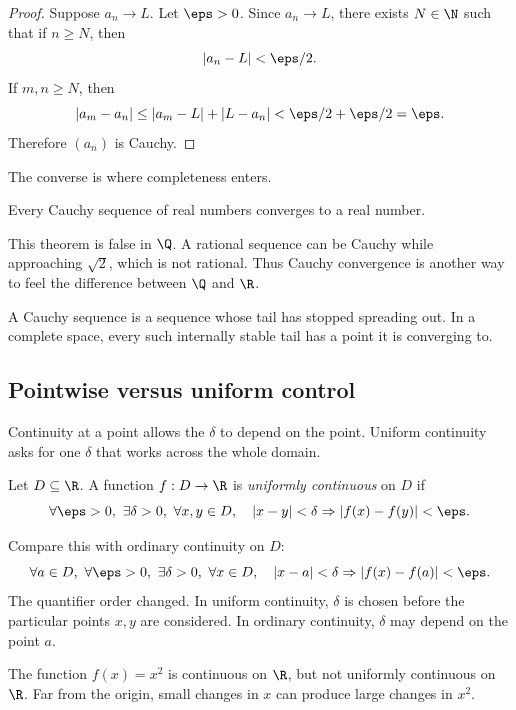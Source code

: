 \begin{proof}
Suppose $a_n\to L$. Let $\eps>0$. Since $a_n\to L$, there exists
$N\in\N$ such that if $n\geq N$, then
\[
|a_n-L|<\eps/2.
\]
If $m,n\geq N$, then
\[
|a_m-a_n|\leq |a_m-L|+|L-a_n|<\eps/2+\eps/2=\eps.
\]
Therefore $(a_n)$ is Cauchy.
\end{proof}

The converse is where completeness enters.

\begin{theorem}
Every Cauchy sequence of real numbers converges to a real number.
\end{theorem}

This theorem is false in $\Q$. A rational sequence can be Cauchy while
approaching $\sqrt2$, which is not rational. Thus Cauchy convergence is another
way to feel the difference between $\Q$ and $\R$.

\begin{intuitionbox}
A Cauchy sequence is a sequence whose tail has stopped spreading out. In a
complete space, every such internally stable tail has a point it is converging
to.
\end{intuitionbox}

\subsection{Pointwise versus uniform control}

Continuity at a point allows the $\delta$ to depend on the point. Uniform
continuity asks for one $\delta$ that works across the whole domain.

\begin{definition}
Let $D\subseteq\R$. A function $f:D\to\R$ is \emph{uniformly continuous} on
$D$ if
\[
\forall \eps>0,\ \exists \delta>0,\ \forall x,y\in D,\quad
|x-y|<\delta\Rightarrow |f(x)-f(y)|<\eps.
\]
\end{definition}

Compare this with ordinary continuity on $D$:
\[
\forall a\in D,\ \forall \eps>0,\ \exists \delta>0,\ \forall x\in D,\quad
|x-a|<\delta\Rightarrow |f(x)-f(a)|<\eps.
\]
The quantifier order changed. In uniform continuity, $\delta$ is chosen before
the particular points $x,y$ are considered. In ordinary continuity, $\delta$ may
depend on the point $a$.

\begin{example}
The function $f(x)=x^2$ is continuous on $\R$, but not uniformly continuous on
$\R$. Far from the origin, small changes in $x$ can produce large changes in
$x^2$.
\end{example}


